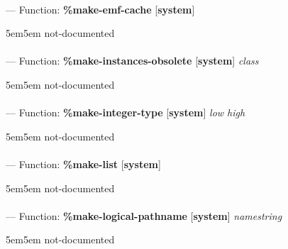 \paragraph{}
\label{SYSTEM:MAKE-EMF-CACHE}
--- Function: \textbf{\%make-emf-cache} [\textbf{system}] \textit{}

\begin{adjustwidth}{5em}{5em}
not-documented
\end{adjustwidth}

\paragraph{}
\label{SYSTEM:MAKE-INSTANCES-OBSOLETE}
--- Function: \textbf{\%make-instances-obsolete} [\textbf{system}] \textit{class}

\begin{adjustwidth}{5em}{5em}
not-documented
\end{adjustwidth}

\paragraph{}
\label{SYSTEM:MAKE-INTEGER-TYPE}
--- Function: \textbf{\%make-integer-type} [\textbf{system}] \textit{low high}

\begin{adjustwidth}{5em}{5em}
not-documented
\end{adjustwidth}

\paragraph{}
\label{SYSTEM:MAKE-LIST}
--- Function: \textbf{\%make-list} [\textbf{system}] \textit{}

\begin{adjustwidth}{5em}{5em}
not-documented
\end{adjustwidth}

\paragraph{}
\label{SYSTEM:MAKE-LOGICAL-PATHNAME}
--- Function: \textbf{\%make-logical-pathname} [\textbf{system}] \textit{namestring}

\begin{adjustwidth}{5em}{5em}
not-documented
\end{adjustwidth}

